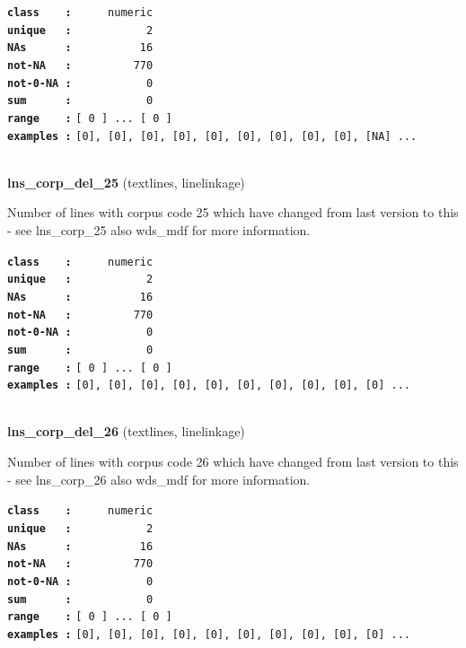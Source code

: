 \documentclass[]{article}
\begin{document}
\textbf{\texttt{class\ \ \ \ :}} \texttt{~~~~~numeric}\\
\textbf{\texttt{unique\ \ \ :}} \texttt{~~~~~~~~~~~2}\\
\textbf{\texttt{NAs\ \ \ \ \ \ :}} \texttt{~~~~~~~~~~16}\\
\textbf{\texttt{not-NA\ \ \ :}} \texttt{~~~~~~~~~770}\\
\textbf{\texttt{not-0-NA\ :}} \texttt{~~~~~~~~~~~0}\\
\textbf{\texttt{sum\ \ \ \ \ \ :}} \texttt{~~~~~~~~~~~0}\\
\textbf{\texttt{range\ \ \ \ :}}
\texttt{{[}\ 0\ {]}\ ...\ {[}\ 0\ {]}}\\
\textbf{\texttt{examples\ :}}
\texttt{{[}0{]},\ {[}0{]},\ {[}0{]},\ {[}0{]},\ {[}0{]},\ {[}0{]},\ {[}0{]},\ {[}0{]},\ {[}0{]},\ {[}NA{]}\ ...}\\

~

\textbf{lns\_corp\_del\_25} (textlines, linelinkage)

Number of lines with corpus code 25 which have changed from last version
to this - see lns\_corp\_25 also wds\_mdf for more information.

\textbf{\texttt{class\ \ \ \ :}} \texttt{~~~~~numeric}\\
\textbf{\texttt{unique\ \ \ :}} \texttt{~~~~~~~~~~~2}\\
\textbf{\texttt{NAs\ \ \ \ \ \ :}} \texttt{~~~~~~~~~~16}\\
\textbf{\texttt{not-NA\ \ \ :}} \texttt{~~~~~~~~~770}\\
\textbf{\texttt{not-0-NA\ :}} \texttt{~~~~~~~~~~~0}\\
\textbf{\texttt{sum\ \ \ \ \ \ :}} \texttt{~~~~~~~~~~~0}\\
\textbf{\texttt{range\ \ \ \ :}}
\texttt{{[}\ 0\ {]}\ ...\ {[}\ 0\ {]}}\\
\textbf{\texttt{examples\ :}}
\texttt{{[}0{]},\ {[}0{]},\ {[}0{]},\ {[}0{]},\ {[}0{]},\ {[}0{]},\ {[}0{]},\ {[}0{]},\ {[}0{]},\ {[}0{]}\ ...}\\

~

\textbf{lns\_corp\_del\_26} (textlines, linelinkage)

Number of lines with corpus code 26 which have changed from last version
to this - see lns\_corp\_26 also wds\_mdf for more information.

\textbf{\texttt{class\ \ \ \ :}} \texttt{~~~~~numeric}\\
\textbf{\texttt{unique\ \ \ :}} \texttt{~~~~~~~~~~~2}\\
\textbf{\texttt{NAs\ \ \ \ \ \ :}} \texttt{~~~~~~~~~~16}\\
\textbf{\texttt{not-NA\ \ \ :}} \texttt{~~~~~~~~~770}\\
\textbf{\texttt{not-0-NA\ :}} \texttt{~~~~~~~~~~~0}\\
\textbf{\texttt{sum\ \ \ \ \ \ :}} \texttt{~~~~~~~~~~~0}\\
\textbf{\texttt{range\ \ \ \ :}}
\texttt{{[}\ 0\ {]}\ ...\ {[}\ 0\ {]}}\\
\textbf{\texttt{examples\ :}}
\texttt{{[}0{]},\ {[}0{]},\ {[}0{]},\ {[}0{]},\ {[}0{]},\ {[}0{]},\ {[}0{]},\ {[}0{]},\ {[}0{]},\ {[}0{]}\ ...}\\
\end{document}
